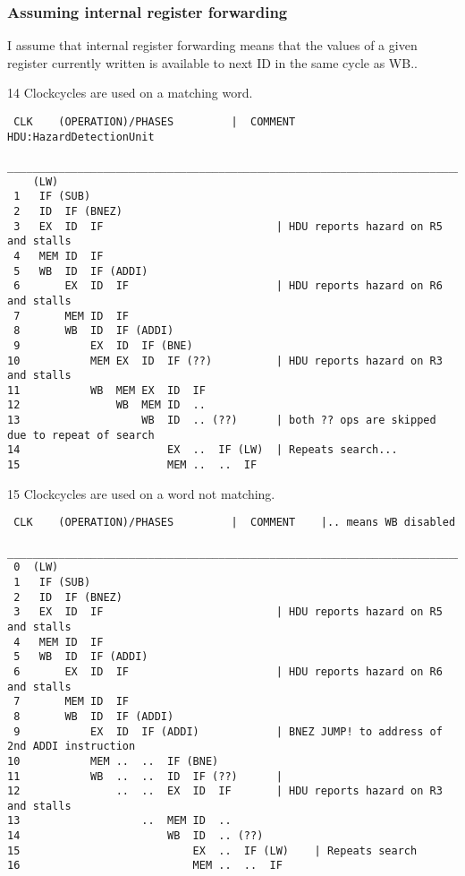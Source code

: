 \documentclass[a4paper,10pt]{article}
\begin{document}
\newpage
\subsubsection{Assuming internal register forwarding}
I assume that internal register forwarding means that the values of a given register currently written is available to next ID in the same cycle as WB..

14 Clockcycles are used on a matching word.
\begin{verbatim}
 CLK    (OPERATION)/PHASES         |  COMMENT   HDU:HazardDetectionUnit
 ________________________________________________________________________________________________
    (LW)  
 1   IF (SUB)
 2   ID  IF (BNEZ) 
 3   EX  ID  IF                           | HDU reports hazard on R5 and stalls
 4   MEM ID  IF     
 5   WB  ID  IF (ADDI)
 6       EX  ID  IF                       | HDU reports hazard on R6 and stalls
 7       MEM ID  IF    
 8       WB  ID  IF (ADDI) 
 9           EX  ID  IF (BNE)
10           MEM EX  ID  IF (??)          | HDU reports hazard on R3 and stalls
11           WB  MEM EX  ID  IF           
12               WB  MEM ID  ..   
13                   WB  ID  .. (??)      | both ?? ops are skipped due to repeat of search
14                       EX  ..  IF (LW)  | Repeats search...
15                       MEM ..  ..  IF   
\end{verbatim}


15 Clockcycles are used on a word not matching.
\begin{verbatim}
 CLK    (OPERATION)/PHASES         |  COMMENT    |.. means WB disabled
 ________________________________________________________________________________________________
 0  (LW)  
 1   IF (SUB)
 2   ID  IF (BNEZ) 
 3   EX  ID  IF                           | HDU reports hazard on R5 and stalls
 4   MEM ID  IF     
 5   WB  ID  IF (ADDI)
 6       EX  ID  IF                       | HDU reports hazard on R6 and stalls
 7       MEM ID  IF    
 8       WB  ID  IF (ADDI)
 9           EX  ID  IF (ADDI)            | BNEZ JUMP! to address of 2nd ADDI instruction
10           MEM ..  ..  IF (BNE)
11           WB  ..  ..  ID  IF (??)      | 
12               ..  ..  EX  ID  IF       | HDU reports hazard on R3 and stalls
13                   ..  MEM ID  ..  
14                       WB  ID  .. (??)
15                           EX  ..  IF (LW)    | Repeats search
16                           MEM ..  ..  IF
\end{verbatim}
\end{document}
